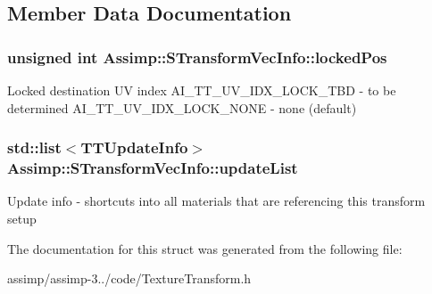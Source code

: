 \subsection{Member Data Documentation}
\hypertarget{struct_assimp_1_1_s_transform_vec_info_a3233c0d7f6a3caefa25aaa2740edd443}{
\subsubsection[{locked\+Pos}]{\setlength{\rightskip}{0pt plus 5cm}unsigned int Assimp\+::\+S\+Transform\+Vec\+Info\+::locked\+Pos}}\label{struct_assimp_1_1_s_transform_vec_info_a3233c0d7f6a3caefa25aaa2740edd443}
Locked destination U\+V index A\+I\+\_\+\+T\+T\+\_\+\+U\+V\+\_\+\+I\+D\+X\+\_\+\+L\+O\+C\+K\+\_\+\+T\+B\+D -\/ to be determined A\+I\+\_\+\+T\+T\+\_\+\+U\+V\+\_\+\+I\+D\+X\+\_\+\+L\+O\+C\+K\+\_\+\+N\+O\+N\+E -\/ none (default) \hypertarget{struct_assimp_1_1_s_transform_vec_info_a6ccefe9b1d6992c90f0a310ae568bd9d}{
\subsubsection[{update\+List}]{\setlength{\rightskip}{0pt plus 5cm}std\+::list$<${\bf T\+T\+Update\+Info}$>$ Assimp\+::\+S\+Transform\+Vec\+Info\+::update\+List}}\label{struct_assimp_1_1_s_transform_vec_info_a6ccefe9b1d6992c90f0a310ae568bd9d}
Update info -\/ shortcuts into all materials that are referencing this transform setup 

The documentation for this struct was generated from the following file\+:\begin{DoxyCompactItemize}
\item 
assimp/assimp-\/3../code/Texture\+Transform.\+h\end{DoxyCompactItemize}
